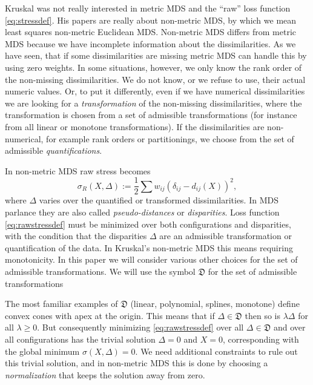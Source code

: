 \documentclass[
  12pt,
]{article}
\begin{document}
Kruskal was not really interested in metric MDS and the ``raw'' loss
function \eqref{eq:stressdef}. His papers are really about non-metric
MDS, by which we mean least squares non-metric Euclidean MDS. Non-metric
MDS differs from metric MDS because we have incomplete information about
the dissimilarities. As we have seen, that if some dissimilarities are
missing metric MDS can handle this by using zero weights. In some
situations, however, we only know the rank order of the non-missing
dissimilarities. We do not know, or we refuse to use, their actual
numeric values. Or, to put it differently, even if we have numerical
dissimilarities we are looking for a \emph{transformation} of the non-missing
dissimilarities, where the transformation is chosen from a set of
admissible transformations (for instance from all linear or monotone
transformations). If the dissimilarities are non-numerical, for example
rank orders or partitionings, we choose from the set of admissible
\emph{quantifications}.

In non-metric MDS raw stress becomes
\begin{equation}
\sigma_R(X,\Delta):=\frac12\sum w_{ij}(\delta_{ij}-d_{ij}(X))^2,
\label{eq:rawstressdef}
\end{equation}
where \(\Delta\) varies over the quantified or transformed
dissimilarities. In MDS parlance they are also called \emph{pseudo-distances}
or \emph{disparities}. Loss function \eqref{eq:rawstressdef} must be minimized
over both configurations and disparities, with the condition that the
disparities \(\Delta\) are an admissible transformation or quantification
of the data. In Kruskal's non-metric MDS this means
requiring monotonicity. In this paper we will consider various other
choices for the set of admissible transformations. We will use the
symbol \(\mathfrak{D}\) for the set of admissible transformations

The most familiar examples of \(\mathfrak{D}\) (linear,
polynomial, splines, monotone) define convex cones with apex at the origin. This
means that if \(\Delta\in\mathfrak{D}\) then so is \(\lambda\Delta\) for all
\(\lambda\geq 0\). But consequently minimizing \eqref{eq:rawstressdef} over
all \(\Delta\in\mathfrak{D}\) and over all configurations has the trivial
solution \(\Delta=0\) and \(X=0\), corresponding with the global minimum
\(\sigma(X,\Delta)=0\). We need additional constraints to rule out this
trivial solution, and in non-metric MDS this is done by choosing a
\emph{normalization} that keeps the solution away from zero.
\end{document}
